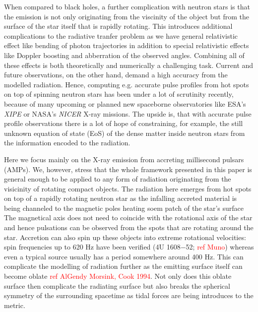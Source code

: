 \documentclass[iop, usenatbib]{emulateapj}
\newcommand{\red}[1]{\textcolor{red}{#1}}
\begin{document}
When compared to black holes, a further complication with neutron stars is that the emission is not only originating from the viscinity of the object but from the surface of the star itself that is rapidly rotating.
This introduces additional complications to the radiative tranfer problem as we have general relativistic effect like bending of photon trajectories in addition to special relativistic effects like Doppler boosting and abberration of the observed angles.
Combining all of these effects is both theoretically and numerically a challenging task.
Current and future observations, on the other hand, demand a high accuracy from the modelled radiation.
Hence, computing e.g. accurate pulse profiles from hot spots on top of spinning neutron stars has been under a lot of scrutinity recently, because of many upcoming or planned new spaceborne observatories like ESA's \textit{XIPE} or NASA's \textit{NICER} X-ray missions.
The upside is, that with accurate pulse profile observations there is a lot of hope of constraining, for example, the still unknown equation of state (EoS) of the dense matter inside neutron stars from the information encoded to the radiation.

Here we focus mainly on the X-ray emission from accreting millisecond pulsars (AMPs).
We, however, stress that the whole framework presented in this paper is general enough to be applied to any form of radiation originating from the visicinity of rotating compact objects. 
The radiation here emerges from hot spots on top of a rapidly rotating neutron star as the infalling accreted material is being channeled to the magnetic poles heating soem patch of the star's surface
The magnetical axis does not need to coincide with the rotational axis of the star and hence pulsations can be observed from the spots that are rotating around the star.
Accretion can also spin up these objects into extreme rotational velocities: spin frequencies up to 620 Hz have been verified (4U 1608$-$52; \red{ref Muno}) whereas even a typical source usually has a period somewhere around 400 Hz.
This can complicate the modelling of radiation further as the emitting surface itself can become oblate \red{ref AlGendy Morsink, Cook 1994}.
Not only does this oblate surface then complicate the radiating surface but also breaks the spherical symmetry of the surrounding spacetime as tidal forces are being introduces to the metric.




\end{document}
